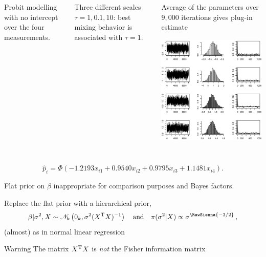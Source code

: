 \begin{slide}

\begin{columns}
Probit modelling  with no intercept over the
four measurements. 

Three different scales $\tau=1,0.1,10$: best mixing behavior is
associated with $\tau=1$.

Average of the parameters over $9,000$ iterations gives plug-in
estimate 
\includegraphics[width=6cm,height=6cm]{figures/hmflatprobit.eps}
\end{columns}
$$
\hat p_i=\Phi\left(-1.2193x_{i1}+0.9540x_{i2}+0.9795x_{i3}+ 1.1481x_{i4}\right).
$$

\end{slide}\begin{slide}

Flat prior on $\beta$ inappropriate for comparison purposes
and Bayes factors. 

\pause Replace the flat prior with a hierarchical prior,
$$
\beta|\sigma^2,X\sim\mathscr{N}_k\left(0_k,\sigma^2(X^\tee X)^{-1}\right)
\quad\text{and}\quad
\pi(\sigma^2|X)\propto \sigma^{\RawSienna{-3/2}} \,,
$$
(almost) as in normal linear regression 

\vs\pause\begin{block}{Warning} 
The matrix $X^{\mathrm{T}} X$ is {\em not} the Fisher information matrix
\end{block}

\end{slide}

